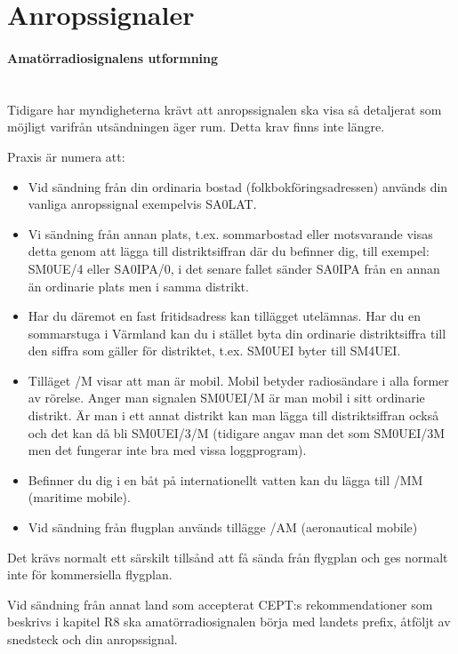 \newpage

\section{Anropssignaler}

\paragraph{Amatörradiosignalens utformning} \hfill \\

Tidigare har myndigheterna krävt att anropssignalen ska visa så
detaljerat som möjligt varifrån utsändningen äger rum. Detta krav
finns inte längre.

Praxis är numera att:

\begin{itemize}
\item Vid sändning från din ordinaria bostad
  (folkbokföringsadressen) används din vanliga anropssignal
  exempelvis SA0LAT.
\item Vi sändning från annan plats, t.ex. sommarbostad eller
  motsvarande visas detta genom att lägga till distriktsiffran där
  du befinner dig, till exempel: SM0UE/4 eller SA0IPA/0, i det
  senare fallet sänder SA0IPA från en annan än ordinarie plats men
  i samma distrikt.
\item Har du däremot en fast fritidsadress kan tillägget
  utelämnas. Har du en sommarstuga i Värmland kan du i stället
  byta din ordinarie distriktsiffra till den siffra som gäller
  för distriktet, t.ex. SM0UEI byter till SM4UEI.
\item Tilläget /M visar att man är mobil. Mobil betyder
  radiosändare i alla former av rörelse. Anger man signalen
  SM0UEI/M är man mobil i sitt ordinarie distrikt. Är man i
  ett annat distrikt kan man lägga till distriktsiffran också
  och det kan då bli SM0UEI/3/M (tidigare angav man det som
  SM0UEI/3M men det fungerar inte bra med vissa loggprogram).
  
\item Befinner du dig i en båt på internationellt vatten kan
  du lägga till /MM (maritime mobile).
\item Vid sändning från flugplan används tillägge /AM
  (aeronautical mobile)
\end{itemize}

Det krävs normalt ett särskilt tillsånd att få sända från flygplan och
ges normalt inte för kommersiella flygplan.

Vid sändning från annat land som accepterat CEPT:s rekommendationer
som beskrivs i kapitel R8 ska amatörradiosignalen börja med landets
prefix, åtföljt av snedsteck och din anropssignal.

